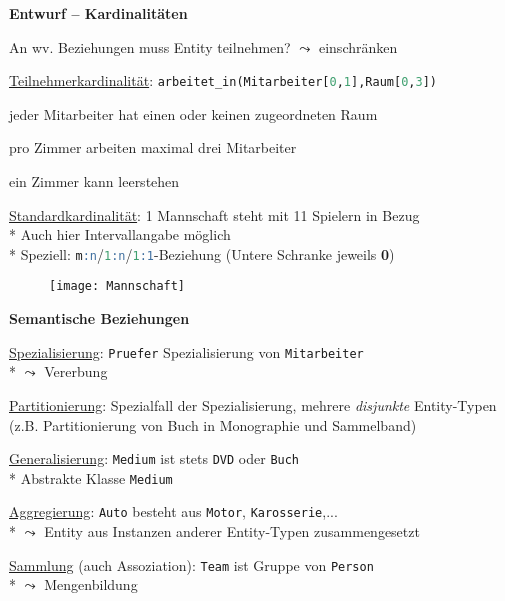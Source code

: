 \textbf{Entwurf -- Kardinalitäten}
\begin{items}
	\item An wv. Beziehungen muss Entity teilnehmen? \( \leadsto \) einschränken
	\item \underline{Teilnehmerkardinalität}: \lstinline[language=sql]{arbeitet_in(Mitarbeiter[0,1],Raum[0,3])}
	\begin{enumeration}
	 	\item jeder Mitarbeiter hat einen oder keinen zugeordneten Raum
	 	\item pro Zimmer arbeiten maximal drei Mitarbeiter
	 	\item ein Zimmer kann leerstehen
	 \end{enumeration} 
	 \item \underline{Standardkardinalität}: 1 Mannschaft steht mit 11 Spielern in Bezug \\*
	 Auch hier Intervallangabe möglich\\*
	  Speziell: \lstinline[language=sql]{m:n}/\lstinline[language=sql]{1:n}/\lstinline[language=sql]{1:1}-Beziehung (Untere Schranke jeweils \textbf{0})
	 \begin{figure}[H]\centering\label{Mannschaft}\texttt{[image: Mannschaft]}\end{figure}
\end{items}



\newpage

\textbf{Semantische Beziehungen}
\begin{items}
	\item \underline{Spezialisierung}: \lstinline[language=sql]{Pruefer} Spezialisierung von \lstinline[language=sql]{Mitarbeiter} \\* \( \leadsto \) Vererbung
	\item \underline{Partitionierung}: Spezialfall der Spezialisierung, mehrere \emph{disjunkte} Entity-Typen (z.B. Partitionierung von Buch in Monographie und Sammelband)
	\item \underline{Generalisierung}: \lstinline[language=sql]{Medium} ist stets \lstinline[language=sql]{DVD} oder \lstinline[language=sql]{Buch} \\* Abstrakte Klasse \lstinline[language=sql]{Medium}
	\item \underline{Aggregierung}: \lstinline[language=sql]{Auto} besteht aus \lstinline[language=sql]{Motor}, \lstinline[language=sql]{Karosserie},... \\* \( \leadsto \) Entity aus Instanzen anderer Entity-Typen zusammengesetzt
	\item \underline{Sammlung} (auch Assoziation): \lstinline[language=sql]{Team} ist Gruppe von \lstinline[language=sql]{Person} \\* \( \leadsto \) Mengenbildung
\end{items}

